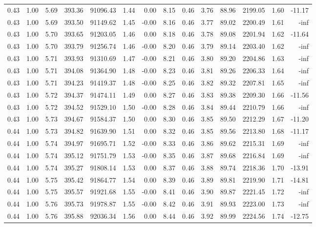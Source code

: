 \begin{table}[!ht]
\begin{tabular}{rrrrrrrrrrrrrr}
0.43 & 1.00 & 5.69 & 393.36 & 91096.43 & 1.44 & 0.00 & 8.15 & 0.46 & 3.76 & 88.96 & 2199.05 & 1.60 & -11.17 \\
0.43 & 1.00 & 5.69 & 393.50 & 91149.62 & 1.45 & -0.00 & 8.16 & 0.46 & 3.77 & 89.02 & 2200.49 & 1.61 & -inf \\
0.43 & 1.00 & 5.70 & 393.65 & 91203.05 & 1.46 & 0.00 & 8.18 & 0.46 & 3.78 & 89.08 & 2201.94 & 1.62 & -11.64 \\
0.43 & 1.00 & 5.70 & 393.79 & 91256.74 & 1.46 & -0.00 & 8.20 & 0.46 & 3.79 & 89.14 & 2203.40 & 1.62 & -inf \\
0.43 & 1.00 & 5.71 & 393.93 & 91310.69 & 1.47 & -0.00 & 8.21 & 0.46 & 3.80 & 89.20 & 2204.86 & 1.63 & -inf \\
0.43 & 1.00 & 5.71 & 394.08 & 91364.90 & 1.48 & -0.00 & 8.23 & 0.46 & 3.81 & 89.26 & 2206.33 & 1.64 & -inf \\
0.43 & 1.00 & 5.71 & 394.23 & 91419.37 & 1.48 & -0.00 & 8.25 & 0.46 & 3.82 & 89.32 & 2207.81 & 1.65 & -inf \\
0.43 & 1.00 & 5.72 & 394.37 & 91474.11 & 1.49 & 0.00 & 8.27 & 0.46 & 3.83 & 89.38 & 2209.30 & 1.66 & -11.56 \\
0.43 & 1.00 & 5.72 & 394.52 & 91529.10 & 1.50 & -0.00 & 8.28 & 0.46 & 3.84 & 89.44 & 2210.79 & 1.66 & -inf \\
0.43 & 1.00 & 5.73 & 394.67 & 91584.37 & 1.50 & 0.00 & 8.30 & 0.46 & 3.85 & 89.50 & 2212.29 & 1.67 & -11.20 \\
0.44 & 1.00 & 5.73 & 394.82 & 91639.90 & 1.51 & 0.00 & 8.32 & 0.46 & 3.85 & 89.56 & 2213.80 & 1.68 & -11.17 \\
0.44 & 1.00 & 5.74 & 394.97 & 91695.71 & 1.52 & -0.00 & 8.33 & 0.46 & 3.86 & 89.62 & 2215.31 & 1.69 & -inf \\
0.44 & 1.00 & 5.74 & 395.12 & 91751.79 & 1.53 & -0.00 & 8.35 & 0.46 & 3.87 & 89.68 & 2216.84 & 1.69 & -inf \\
0.44 & 1.00 & 5.74 & 395.27 & 91808.14 & 1.53 & 0.00 & 8.37 & 0.46 & 3.88 & 89.74 & 2218.36 & 1.70 & -13.91 \\
0.44 & 1.00 & 5.75 & 395.42 & 91864.77 & 1.54 & 0.00 & 8.39 & 0.46 & 3.89 & 89.81 & 2219.90 & 1.71 & -14.81 \\
0.44 & 1.00 & 5.75 & 395.57 & 91921.68 & 1.55 & -0.00 & 8.41 & 0.46 & 3.90 & 89.87 & 2221.45 & 1.72 & -inf \\
0.44 & 1.00 & 5.76 & 395.73 & 91978.87 & 1.55 & -0.00 & 8.42 & 0.46 & 3.91 & 89.93 & 2223.00 & 1.73 & -inf \\
0.44 & 1.00 & 5.76 & 395.88 & 92036.34 & 1.56 & 0.00 & 8.44 & 0.46 & 3.92 & 89.99 & 2224.56 & 1.74 & -12.75 \\

\end{tabular}
\end{table}
